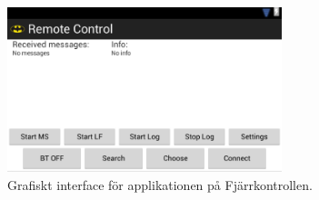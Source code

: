 \begin{figure}[htbp!]
\centering
\includegraphics[width=8cm]{../../includes/figures/remoteApp.png}
\caption{Grafiskt interface för applikationen på Fjärrkontrollen.}
\label{fig:remoteApp}
\end{figure}
